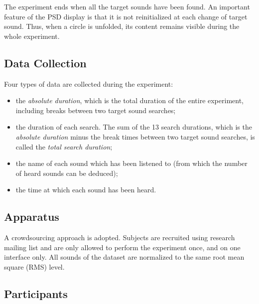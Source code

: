 \documentclass{aes2e}
\begin{document}
The experiment ends when all the target sounds have been found. An important feature of the PSD display is that it is not reinitialized at each change of target sound. Thus, when a circle is unfolded, its content remains visible during the whole experiment.

\subsection{Data Collection}
Four types of data are collected during the experiment:
\begin{itemize}
\item the \textit{absolute duration}, which is the total duration of the entire experiment, including breaks between two target sound searches;
\item the duration of each search. The sum of the 13 search durations, which is the \textit{absolute duration} minus the break times between two target sound searches, is called the \textit{total search duration};
\item the name of each sound which has been listened to (from which the number of heard sounds can be deduced);
\item the time at which each sound has been heard.  
\end{itemize}

\subsection{Apparatus}

A crowdsourcing approach is adopted. 
Subjects are recruited using research mailing list and are only allowed to perform the experiment once, and on one interface only. %
All sounds of the dataset are normalized to the same root mean square (RMS) level.


\subsection{Participants}
\end{document}
